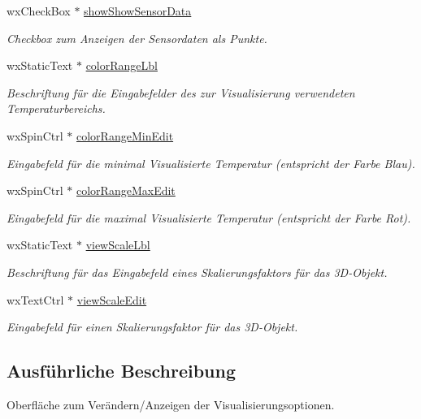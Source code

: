 \begin{DoxyCompactItemize}
wx\-Check\-Box $\ast$ \hyperlink{classViewpropBox_a731fabc531998315b0850a3b60eb3c51}{show\-Show\-Sensor\-Data}
\begin{DoxyCompactList}\small\item\em Checkbox zum Anzeigen der Sensordaten als Punkte. \end{DoxyCompactList}\item 
wx\-Static\-Text $\ast$ \hyperlink{classViewpropBox_a562f38091ff255820b63734e7d4b1ff8}{color\-Range\-Lbl}
\begin{DoxyCompactList}\small\item\em Beschriftung für die Eingabefelder des zur Visualisierung verwendeten Temperaturbereichs. \end{DoxyCompactList}\item 
wx\-Spin\-Ctrl $\ast$ \hyperlink{classViewpropBox_a64af7732726775603579fedcf231d5e0}{color\-Range\-Min\-Edit}
\begin{DoxyCompactList}\small\item\em Eingabefeld für die minimal Visualisierte Temperatur (entspricht der Farbe Blau). \end{DoxyCompactList}\item 
wx\-Spin\-Ctrl $\ast$ \hyperlink{classViewpropBox_ab87e9eba3e16969c4423ff0790ccf99c}{color\-Range\-Max\-Edit}
\begin{DoxyCompactList}\small\item\em Eingabefeld für die maximal Visualisierte Temperatur (entspricht der Farbe Rot). \end{DoxyCompactList}\item 
wx\-Static\-Text $\ast$ \hyperlink{classViewpropBox_ab312348ae97369e3b8a1a7ce8ba9e2b1}{view\-Scale\-Lbl}
\begin{DoxyCompactList}\small\item\em Beschriftung für das Eingabefeld eines Skalierungsfaktors für das 3\-D-\/\-Objekt. \end{DoxyCompactList}\item 
wx\-Text\-Ctrl $\ast$ \hyperlink{classViewpropBox_ae275307ddd3a84c91298e78b826f1ae1}{view\-Scale\-Edit}
\begin{DoxyCompactList}\small\item\em Eingabefeld für einen Skalierungsfaktor für das 3\-D-\/\-Objekt. \end{DoxyCompactList}\end{DoxyCompactItemize}


\subsection{Ausführliche Beschreibung}
Oberfläche zum Verändern/\-Anzeigen der Visualisierungsoptionen. 

